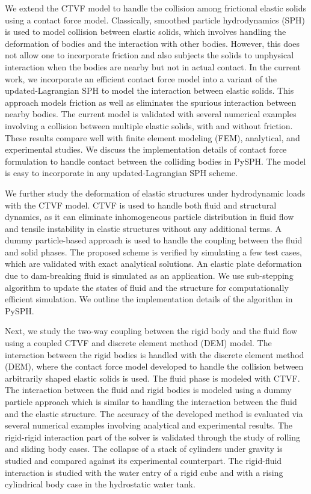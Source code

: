 \begin{Abstract}
  We extend the CTVF model to handle the collision among frictional elastic
  solids using a contact force model. Classically, smoothed particle
  hydrodynamics (SPH) is used to model collision between elastic solids, which
  involves handling the deformation of bodies and the interaction with other
  bodies. However, this does not allow one to incorporate friction and also
  subjects the solids to unphysical interaction when the bodies are nearby but
  not in actual contact. In the current work, we incorporate an efficient
  contact force model into a variant of the updated-Lagrangian SPH to model the
  interaction between elastic solids. This approach models friction as well as
  eliminates the spurious interaction between nearby bodies. The current model
  is validated with several numerical examples involving a collision between
  multiple elastic solids, with and without friction. These results compare well
  with finite element modeling (FEM), analytical, and experimental studies. We
  discuss the implementation details of contact force formulation to handle
  contact between the colliding bodies in PySPH. The model is easy to
  incorporate in any updated-Lagrangian SPH scheme.


  We further study the deformation of elastic structures under hydrodynamic
  loads with the CTVF model. CTVF is used to handle both fluid and structural
  dynamics, as it can eliminate inhomogeneous particle distribution in fluid
  flow and tensile instability in elastic structures without any additional
  terms. A dummy particle-based approach is used to handle the coupling between
  the fluid and solid phases. The proposed scheme is verified by simulating a
  few test cases, which are validated with exact analytical solutions. An
  elastic plate deformation due to dam-breaking fluid is simulated as an
  application. We use sub-stepping algorithm to update the states of fluid and
  the structure for computationally efficient simulation. We outline the
  implementation details of the algorithm in PySPH.

  Next, we study the two-way coupling between the rigid body and the fluid flow
  using a coupled CTVF and discrete element method (DEM) model. The
  interaction between the rigid bodies is handled with the discrete element
  method (DEM), where the contact force model developed to handle the collision
  between arbitrarily shaped elastic solids is used. The fluid phase is modeled
  with CTVF. The interaction between the fluid and rigid bodies is modeled using
  a dummy particle approach which is similar to handling the interaction between
  the fluid and the elastic structure. The accuracy of the developed method is
  evaluated via several numerical examples involving analytical and experimental
  results. The rigid-rigid interaction part of the solver is validated through
  the study of rolling and sliding body cases. The collapse of a stack of
  cylinders under gravity is studied and compared against its experimental
  counterpart. The rigid-fluid interaction is studied with the water entry of a
  rigid cube and with a rising cylindrical body case in the hydrostatic water
  tank.


\end{Abstract}
